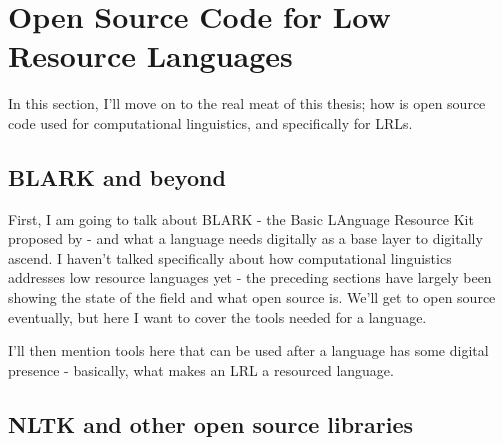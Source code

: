 \section{Open Source Code for Low Resource Languages}\label{sec:endlangcode}

In this section, I'll move on to the real meat of this thesis; how is open source code used for computational linguistics, and specifically for LRLs.

\subsection{BLARK and beyond}

First, I am going to talk about BLARK - the Basic LAnguage Resource Kit proposed by \citet{krauwer2003basic} - and what a language needs digitally as a base layer to digitally ascend. I haven't talked specifically about how computational linguistics addresses low resource languages yet - the preceding sections have largely been showing the state of the field and what open source is. We'll get to open source eventually, but here I want to cover the tools needed for a language.

I'll then mention tools here that can be used after a language has some digital presence - basically, what makes an LRL a resourced language.





\subsection{NLTK and other open source libraries}

